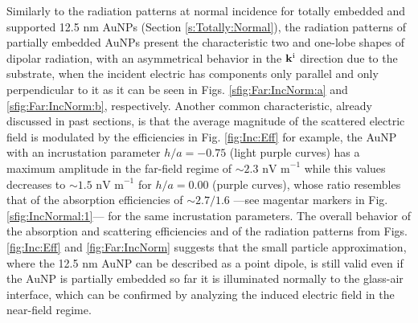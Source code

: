 Similarly to the radiation patterns at normal incidence for totally embedded and supported 12.5 nm AuNPs (Section \ref{s:Totally:Normal}), the radiation patterns of partially embedded AuNPs present the characteristic two and one-lobe shapes of dipolar radiation, with an asymmetrical behavior in the $\vb{k}^\text{i}$ direction due to the substrate, when  the incident electric has components only parallel and only perpendicular to it as it can be seen in Figs. \ref{sfig:Far:IncNorm:a} and \ref{sfig:Far:IncNorm:b}, respectively. Another common characteristic, already discussed in past sections, is that the average magnitude of the scattered electric field is modulated by the efficiencies in Fig. \ref{fig:Inc:Eff} for example, the AuNP with an incrustation parameter $h/a = -0.75$ (light purple curves) has a maximum amplitude in the far-field regime of $\sim  2.3 \text{ nV m}^{-1} $ while this values decreases to $\sim 1.5 \text{ nV m}^{-1} $ for $h/a = 0.00$ (purple curves), whose ratio resembles that of the absorption efficiencies of $\sim 2.7/1.6$ ---see magentar markers in Fig. \ref{sfig:IncNormal:1}--- for the same incrustation parameters. The overall behavior of the absorption and scattering efficiencies and of the radiation patterns
from Figs. \ref{fig:Inc:Eff} and \ref{fig:Far:IncNorm} suggests that the small particle approximation, where the 12.5 nm AuNP can be described as a point dipole, is still valid even if the AuNP is partially embedded so far it is illuminated normally to the glass-air interface, which can be confirmed by analyzing the induced electric field in the near-field regime.

